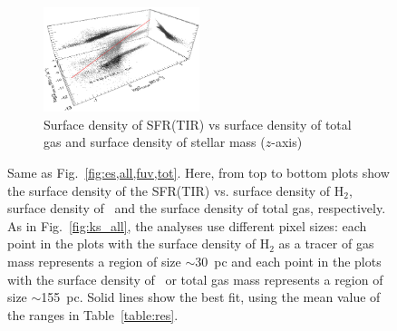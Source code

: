 \begin{figure}
\begin{subfigure}[b]{\textwidth}
        \centering
        \includegraphics[width=0.5\textwidth]{../image_paper1/es_tot_fir_vs_tot2_f.png}
        \captionsetup{font=tiny}
        \caption{Surface density of SFR(TIR) vs surface density of total gas and surface density of stellar mass ($z$-axis)}
        \label{fig:es,all,fir,tot}
    \end{subfigure}
       \caption[Same as Fig.~\ref{fig:es,all,fuv,tot}, but here the surface density of the SFR(TIR) versus three gas tracer are used]{Same as Fig.~\ref{fig:es,all,fuv,tot}. Here, from top to bottom plots show the surface density of the SFR(TIR) vs. surface density of H$_2$, surface density of \hi\, and the surface density of total gas, respectively. As in Fig.~\ref{fig:ks_all}, the analyses use different pixel sizes: each point in the plots with the surface density of H$_2$ as a tracer of gas mass represents a region of size $\sim$30~pc and each point in the plots with the surface density of \hi\ or total gas mass represents a region of size $\sim$155~pc. Solid lines show the best fit, using the mean value of the ranges in Table~\ref{table:res}.}
       \label{fig:es,fir}
\end{figure}


